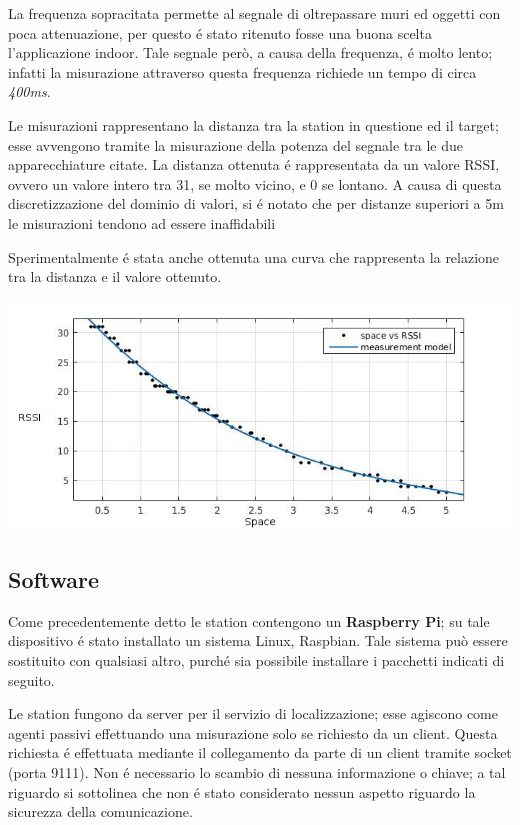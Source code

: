 \documentclass{article}
\begin{document}
La frequenza sopracitata permette al segnale di oltrepassare muri ed oggetti con poca attenuazione, per questo \'e stato ritenuto fosse una buona scelta l'applicazione indoor.
Tale segnale per\`o, a causa della frequenza, \'e molto lento; infatti la misurazione attraverso questa frequenza richiede un tempo di circa \textit{400ms}.

Le misurazioni rappresentano la distanza tra la station in questione ed il target; esse avvengono tramite la misurazione della potenza del segnale tra le due apparecchiature citate.
La distanza ottenuta \'e rappresentata da un valore RSSI, ovvero un valore intero tra 31, se molto vicino, e 0 se lontano.
A causa di questa discretizzazione del dominio di valori, si \'e notato che per distanze superiori a 5m le misurazioni tendono ad essere inaffidabili

Sperimentalmente \'e stata anche ottenuta una curva che rappresenta la relazione tra la distanza e il valore ottenuto.

\begin{center}
	\includegraphics[scale=0.5]{manual_imgs/space_to_rssi}
\end{center}

\subsection{Software}
Come precedentemente detto le station contengono un \textbf{Raspberry Pi}; su tale dispositivo \'e stato installato un sistema Linux, Raspbian. Tale sistema pu\`o essere sostituito con qualsiasi altro, purch\'e sia possibile installare i pacchetti indicati di seguito.

Le station fungono da server per il servizio di localizzazione; esse agiscono come agenti passivi effettuando una misurazione solo se richiesto da un client.
Questa richiesta \'e effettuata mediante il collegamento da parte di un client tramite socket (porta 9111). Non \'e necessario lo scambio di nessuna informazione o chiave; a tal riguardo si sottolinea che non \'e stato considerato nessun aspetto riguardo la sicurezza della comunicazione.
\end{document}
